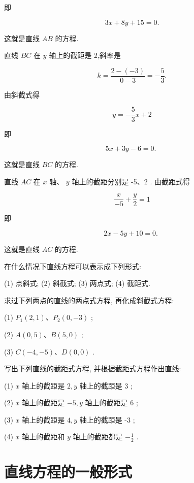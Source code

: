 \documentclass[lang=cn,newtx,10.5pt,scheme=chinese]{elegantbook}
\begin{document}
即

\[
    {3x} + {8y} + {15} = 0.
\]

这就是直线 \({AB}\) 的方程.

直线 \({BC}\) 在 \(y\) 轴上的截距是 2,斜率是

\[
  k = \frac{2 - \left( {-3}\right) }{0 - 3} = - \frac{5}{3}.
\]

由斜截式得

\[
  y = - \frac{5}{3}x + 2
\]

即

\[
    {5x} + {3y} - 6 = 0\text{. }
\]

这就是直线 \({BC}\) 的方程.

直线 \({AC}\) 在 \(x\) 轴、 \(y\) 轴上的截距分别是 -5、2 . 由截距式得

\[
  \frac{x}{-5} + \frac{y}{2} = 1
\]

即

\[
    {2x} - {5y} + {10} = 0\text{. }
\]

这就是直线 \({AC}\) 的方程.

\begin{problemset}[练习]

\item 在什么情况下直线方程可以表示成下列形式:

(1) 点斜式; (2) 斜截式; (3) 两点式; (4) 截距式.

\item 求过下列两点的直线的两点式方程, 再化成斜截式方程:

(1) \({P}_{1}\left( {2,1}\right) \text{、}{P}_{2}\left( {0, - 3}\right)\) ;

(2) \(A\left( {0,5}\right) \text{、}B\left( {5,0}\right)\) ;

(3) \(C\left( {-4, - 5}\right) \text{、}D\left( {0,0}\right)\) .

\item 写出下列直线的截距式方程, 并根据截距式方程作出直线:

(1) \(x\) 轴上的截距是 \(2,y\) 轴上的截距是 3 ;

(2) \(x\) 轴上的截距是 \(- 5,y\) 轴上的截距是 6 ;

(3) \(x\) 轴上的截距是 \(4,y\) 轴上的截距是 -3 ;

(4) \(x\) 轴上的截距和 \(y\) 轴上的截距都是 \(- \frac{1}{2}\) .
\end{problemset}

\section{直线方程的一般形式}
\end{document}
